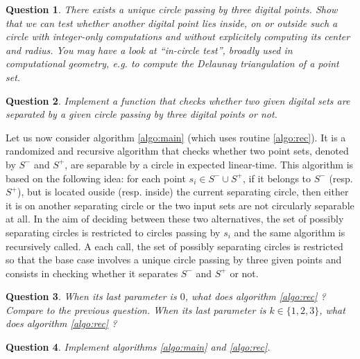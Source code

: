 \documentclass[a4paper, 11pt]{article}
\newtheorem{qu}{Question}
\begin{document}
\begin{qu}
There exists a unique circle passing by three digital points. Show that we can test whether another digital
point lies inside, on or outside such a circle with integer-only computations and without explicitely computing 
its center and radius. You may have a look at ``in-circle test'', broadly used in computational geometry, e.g. 
to compute the Delaunay triangulation of a point set.  
\end{qu}

\begin{qu}
Implement a function that checks whether two given digital sets are separated by a given circle passing by three
digital points or not.  
\end{qu}

Let us now consider algorithm \ref{algo:main} (which uses routine \ref{algo:rec}). 
It is a randomized and recursive algorithm that checks whether two point sets, 
denoted by $S^-$ and $S^+$, are separable by a circle in expected linear-time.  
This algorithm is based on the following idea:
for each point $s_i \in S^- \cup S^+$, if it belongs to $S^-$ (resp. $S^+$), 
but is located ouside (resp. inside) the current separating circle, then either it is on another
separating circle or the two input sets are not circularly separable at all.   
In the aim of deciding between these two alternatives, the set of possibly separating 
circles is restricted to circles passing by $s_i$ and the same algorithm is recursively called. 
A each call, the set of possibly separating circles is restricted so that the base case involves 
a unique circle passing by three given points and consists in checking whether it separates 
$S^-$ and $S^+$ or not.  

\begin{qu}
When its last parameter is $0$, what does algorithm \ref{algo:rec} ? Compare to the previous question.
When its last parameter is $k \in \{1,2,3\}$, what does algorithm \ref{algo:rec} ? 
\end{qu}

\begin{qu}
Implement algorithms \ref{algo:main} and \ref{algo:rec}. 
\end{qu}
\end{document}
